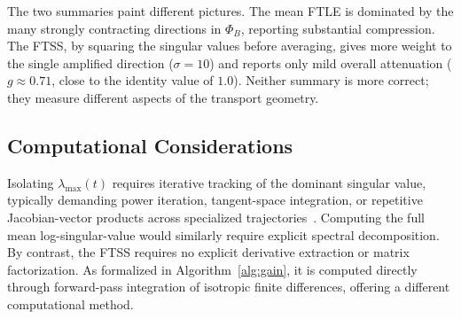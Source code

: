 \documentclass[11pt]{article}
\begin{document}
The two summaries paint different pictures. The mean FTLE is dominated by the 
many strongly contracting directions in $\Phi_B$, reporting substantial 
compression. The FTSS, by squaring the singular values before averaging, 
gives more weight to the single amplified direction ($\sigma=10$) and reports 
only mild overall attenuation ($g \approx 0.71$, close to the identity value 
of $1.0$). Neither summary is more correct; they measure different aspects of 
the transport geometry.

\subsection{Computational Considerations}

Isolating $\lambda_{\max}(t)$ requires iterative tracking of the dominant 
singular value, typically demanding power iteration, tangent-space 
integration, or repetitive Jacobian-vector products across specialized 
trajectories~\cite{benettin1980lyapunov}. Computing the full mean 
log-singular-value would similarly require explicit spectral decomposition. 
By contrast, the FTSS requires no explicit derivative extraction or matrix 
factorization. As formalized in Algorithm~\ref{alg:gain}, it is computed 
directly through forward-pass integration of isotropic finite differences, 
offering a different computational method.
\end{document}
